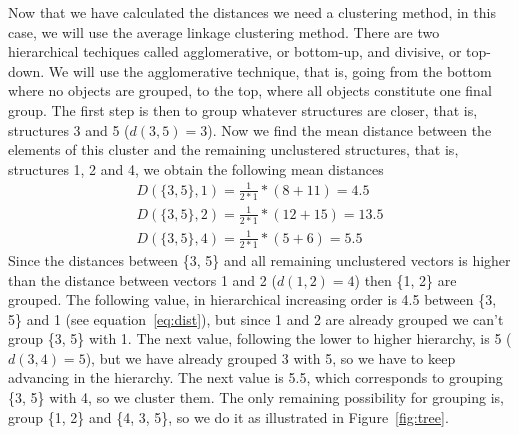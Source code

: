 Now that we have calculated the distances we need a clustering method,
in this case, we will use the average linkage clustering method. There
are two hierarchical techiques called agglomerative, or bottom-up, and
divisive, or  top-down. We will use the  agglomerative technique, that
is, going  from the bottom where  no objects are grouped,  to the top,
where all objects  constitute one final group. The  first step is then
to group whatever  structures are closer, that is,  structures 3 and 5
($d(3, 5)=3$). Now  we find the mean distance  between the elements of
this  cluster  and  the  remaining unclustered  structures,  that  is,
structures 1, 2 and 4, we obtain the following mean distances
\begin{gather}
D(\{3,5\}, 1)=\frac{1}{2*1}*(8+11) = 4.5 \label{eq:dist}\\
D(\{3,5\}, 2)=\frac{1}{2*1}*(12+15) = 13.5\\
D(\{3,5\}, 4)=\frac{1}{2*1}*(5+6) = 5.5
\end{gather}
Since the distances between \{3, 5\} and all remaining unclustered
vectors is higher than the distance between vectors 1 and 2
($d(1, 2)=4$) then \{1, 2\} are grouped. The following value, in
hierarchical increasing order is 4.5 between \{3, 5\} and 1 (see
equation~\ref{eq:dist}), but since 1 and 2 are already
grouped we can't group \{3, 5\} with 1. The next value,
following the lower to higher hierarchy, is 5 ($d(3, 4)=5$), but we have
already grouped 3 with 5, so we have to keep advancing in the
hierarchy. The next value is 5.5, which corresponds to grouping \{3,
5\} with 4, so we cluster them. The only remaining possibility for
grouping is, group \{1, 2\} and \{4, 3, 5\}, so we do it as
illustrated in Figure~\ref{fig:tree}.
